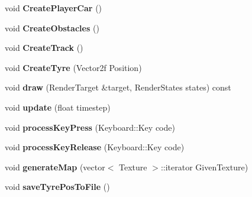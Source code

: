 \begin{DoxyCompactItemize}
\item 
\hypertarget{class_game_a79853b667c44be836272528805943168}{}void {\bfseries Create\+Player\+Car} ()\label{class_game_a79853b667c44be836272528805943168}

\item 
\hypertarget{class_game_adce15c5fa9ad798315a1a7e61c350636}{}void {\bfseries Create\+Obstacles} ()\label{class_game_adce15c5fa9ad798315a1a7e61c350636}

\item 
\hypertarget{class_game_a27ddb8fcd3bb5a510bc33dcc137bdc19}{}void {\bfseries Create\+Track} ()\label{class_game_a27ddb8fcd3bb5a510bc33dcc137bdc19}

\item 
\hypertarget{class_game_adf56462c5f8473018fad9b25cc5af607}{}void {\bfseries Create\+Tyre} (Vector2f Position)\label{class_game_adf56462c5f8473018fad9b25cc5af607}

\item 
\hypertarget{class_game_a260c4d5123eb3a51cbd0bb685546cef4}{}void {\bfseries draw} (Render\+Target \&target, Render\+States states) const \label{class_game_a260c4d5123eb3a51cbd0bb685546cef4}

\item 
\hypertarget{class_game_acc8519c7ced1cf9eb9bbb3a2f325f6a0}{}void {\bfseries update} (float timestep)\label{class_game_acc8519c7ced1cf9eb9bbb3a2f325f6a0}

\item 
\hypertarget{class_game_ad3053e3b15bbcb049dc040801d58be7c}{}void {\bfseries process\+Key\+Press} (Keyboard\+::\+Key code)\label{class_game_ad3053e3b15bbcb049dc040801d58be7c}

\item 
\hypertarget{class_game_adb2ea3b70e0038d2caceedfde3bfc663}{}void {\bfseries process\+Key\+Release} (Keyboard\+::\+Key code)\label{class_game_adb2ea3b70e0038d2caceedfde3bfc663}

\item 
\hypertarget{class_game_a917e25c51c6b20c74e9f9a441c72717e}{}void {\bfseries generate\+Map} (vector$<$ Texture $>$\+::iterator Given\+Texture)\label{class_game_a917e25c51c6b20c74e9f9a441c72717e}

\item 
\hypertarget{class_game_a907fa46ec6aa134985c1845d4cf20de2}{}void {\bfseries save\+Tyre\+Pos\+To\+File} ()\label{class_game_a907fa46ec6aa134985c1845d4cf20de2}


\end{DoxyCompactItemize}
